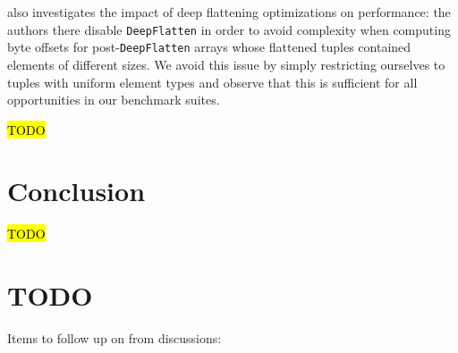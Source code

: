 \documentclass[leqno,11pt]{article}
\begin{document}
\cite{realtime-sml-paper} also investigates the impact of deep flattening optimizations on performance: the authors there disable \texttt{DeepFlatten} in order to avoid complexity when computing byte offsets for post-\texttt{DeepFlatten} arrays whose flattened tuples contained elements of different sizes. We avoid this issue by simply restricting ourselves to tuples with uniform element types and observe that this is sufficient for all opportunities in our benchmark suites.



\hl{TODO}

\section{Conclusion}

\hl{TODO}

\section{TODO}

Items to follow up on from discussions:
\end{document}

